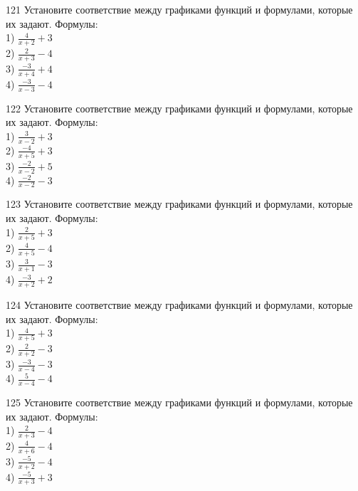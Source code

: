 \documentclass[4apaper]{article}
\begin{document}
\begin{taskBN}{121}
Установите соответствие между графиками функций и формулами, которые их задают. Формулы: \\1) $\frac{4}{x+2}+3$\\2) $\frac{2}{x+3}-4$\\3) $\frac{-3}{x+4}+4$\\4) $\frac{-3}{x-3}-4$
\end{taskBN}

\begin{taskBN}{122}
Установите соответствие между графиками функций и формулами, которые их задают. Формулы: \\1) $\frac{3}{x-2}+3$\\2) $\frac{-4}{x+5}+3$\\3) $\frac{-2}{x-2}+5$\\4) $\frac{-2}{x-2}-3$
\end{taskBN}

\begin{taskBN}{123}
Установите соответствие между графиками функций и формулами, которые их задают. Формулы: \\1) $\frac{2}{x+5}+3$\\2) $\frac{4}{x+5}-4$\\3) $\frac{3}{x+1}-3$\\4) $\frac{-3}{x+2}+2$
\end{taskBN}

\begin{taskBN}{124}
Установите соответствие между графиками функций и формулами, которые их задают. Формулы: \\1) $\frac{4}{x+5}+3$\\2) $\frac{2}{x+2}-3$\\3) $\frac{-3}{x-4}-3$\\4) $\frac{5}{x-4}-4$
\end{taskBN}

\begin{taskBN}{125}
Установите соответствие между графиками функций и формулами, которые их задают. Формулы: \\1) $\frac{2}{x+3}-4$\\2) $\frac{4}{x+6}-4$\\3) $\frac{-5}{x+2}-4$\\4) $\frac{-5}{x+3}+3$
\end{taskBN}
\end{document}
